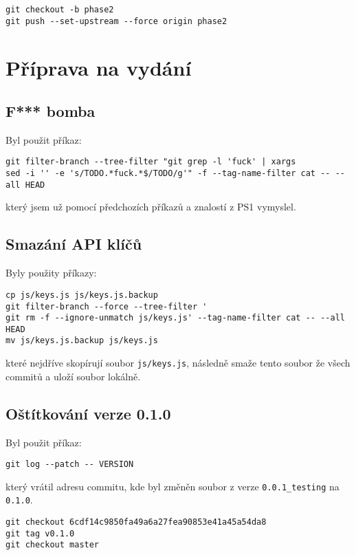 \documentclass[titlepage]{article}
\begin{document}
\begin{verbatim}
git checkout -b phase2
git push --set-upstream --force origin phase2
\end{verbatim}

\section{Příprava na vydání}
\subsection{F*** bomba}

Byl použit příkaz:

\begin{verbatim}
git filter-branch --tree-filter "git grep -l 'fuck' | xargs
sed -i '' -e 's/TODO.*fuck.*$/TODO/g'" -f --tag-name-filter cat -- --all HEAD
\end{verbatim}

který jsem už pomocí předchozích příkazů a znalostí z PS1 vymyslel.

\subsection{Smazání API klíčů}
Byly použity příkazy:
\begin{verbatim}
cp js/keys.js js/keys.js.backup
git filter-branch --force --tree-filter '
git rm -f --ignore-unmatch js/keys.js' --tag-name-filter cat -- --all HEAD
mv js/keys.js.backup js/keys.js
\end{verbatim}

které nejdříve skopírují soubor \texttt{js/keys.js}, následně smaže tento soubor že všech commitů a uloží soubor lokálně.

\subsection{Oštítkování verze 0.1.0}

Byl použit příkaz:

\begin{verbatim}
git log --patch -- VERSION
\end{verbatim}

který vrátil adresu commitu, kde byl změněn soubor z verze \texttt{0.0.1\_testing} na \texttt{0.1.0}.

\begin{verbatim}
git checkout 6cdf14c9850fa49a6a27fea90853e41a45a54da8
git tag v0.1.0
git checkout master
\end{verbatim}
\end{document}
